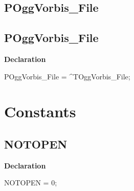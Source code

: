 \documentclass{report}
\newif\ifpdf
\begin{document}
\subsection*{\large{\textbf{POggVorbis{\_}File}}\normalsize\hspace{1ex}\hrulefill}
\else
\subsection*{POggVorbis{\_}File}
\fi
\label{ok_vorbisfile-POggVorbis_File}
\begin{list}{}{
\setlength{\itemindent}{0cm}
\setlength{\listparindent}{0cm}
\setlength{\leftmargin}{\evensidemargin}
\addtolength{\leftmargin}{\tmplength}
\settowidth{\labelsep}{X}
\addtolength{\leftmargin}{\labelsep}
\setlength{\labelwidth}{\tmplength}
}
\item[\textbf{Declaration}\hfill]
\ifpdf
\begin{flushleft}
\fi
\begin{ttfamily}
POggVorbis{\_}File = {\^{}}TOggVorbis{\_}File;\end{ttfamily}

\ifpdf
\end{flushleft}
\fi

\end{list}
\section{Constants}
\ifpdf
\subsection*{\large{\textbf{NOTOPEN}}\normalsize\hspace{1ex}\hrulefill}
\else
\subsection*{NOTOPEN}
\fi
\label{ok_vorbisfile-NOTOPEN}
\begin{list}{}{
\setlength{\itemindent}{0cm}
\setlength{\listparindent}{0cm}
\setlength{\leftmargin}{\evensidemargin}
\addtolength{\leftmargin}{\tmplength}
\settowidth{\labelsep}{X}
\addtolength{\leftmargin}{\labelsep}
\setlength{\labelwidth}{\tmplength}
}
\item[\textbf{Declaration}\hfill]
\ifpdf
\begin{flushleft}
\fi
\begin{ttfamily}
NOTOPEN   = 0;\end{ttfamily}

\ifpdf
\end{flushleft}
\fi

\end{list}
\ifpdf
\end{document}
